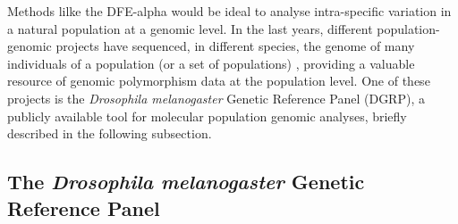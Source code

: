 Methods lilke the DFE-alpha would be ideal to analyse intra-specific variation in a natural population at a genomic level. In the last years, different population-genomic projects have sequenced, in different species, the genome of many individuals of a population (or a set of populations) \citep{The1000GenomesProjectConsortium2010,Mackay2012,Pool2012,Wallberg2014}, providing a valuable resource of genomic polymorphism data at the population level.
One of these projects is the \textit{Drosophila melanogaster} Genetic Reference Panel (DGRP), a publicly available tool for molecular population genomic analyses, briefly described in the following subsection.
%
%
%
%


\subsection{The \textit{Drosophila melanogaster} Genetic Reference Panel} 
\label{DGRP}

